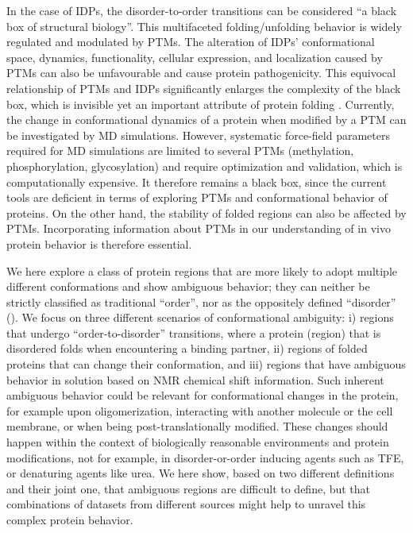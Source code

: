 In the case of IDPs, the disorder-to-order transitions can be considered ``a black box of structural biology''. This multifaceted folding/unfolding behavior is widely regulated and modulated by PTMs. The alteration of IDPs’ conformational space, dynamics, functionality, cellular expression, and localization caused by PTMs can also be unfavourable and cause protein pathogenicity. This equivocal relationship of PTMs and IDPs significantly enlarges the complexity of the black box, which is invisible yet an important attribute of protein folding \cite{bah_modulation_2016}. Currently, the change in conformational dynamics of a protein when modified by a PTM can be investigated by MD simulations. However, systematic force-field parameters required for MD simulations are limited to several PTMs (methylation, phosphorylation, glycosylation) and require optimization and validation, which is computationally expensive. It therefore remains a black box, since the current tools are deficient in terms of exploring PTMs and conformational behavior of proteins. On the other hand, the stability of folded regions can also be affected by PTMs. Incorporating information about PTMs in our understanding of in vivo protein behavior is therefore essential.



We here explore a class of protein regions that are more likely to adopt multiple different conformations and show ambiguous behavior; they can neither be strictly classified as traditional ``order'', nor as the oppositely defined ``disorder'' (). We focus on three different scenarios of conformational ambiguity: i) regions that undergo ``order-to-disorder'' transitions, where a protein (region) that is disordered folds when encountering a binding partner, ii) regions of folded proteins that can change their conformation, and iii) regions that have ambiguous behavior in solution based on NMR chemical shift information. Such inherent ambiguous behavior could be relevant for conformational changes in the protein, for example upon oligomerization, interacting with another molecule or the cell membrane, or when being post-translationally modified. These changes should happen within the context of biologically reasonable environments and protein modifications, not for example, in disorder-or-order inducing agents such as TFE, or denaturing agents like urea. We here show, based on two different definitions and their joint one, that ambiguous regions are difficult to define, but that combinations of datasets from different sources might help to unravel this complex protein behavior.

